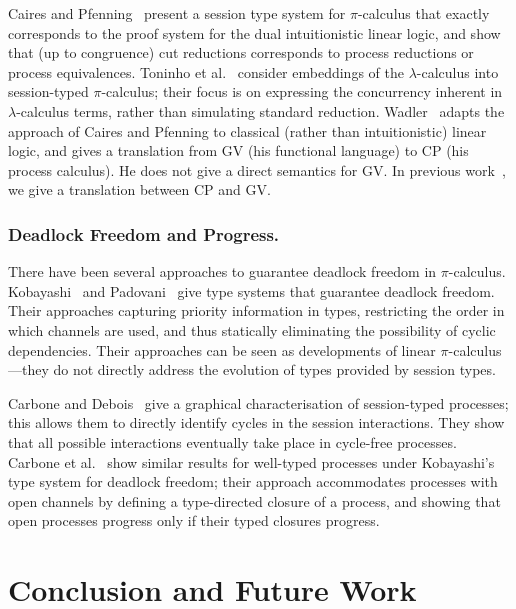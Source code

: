 \documentclass[oribibl,orivec,envcountsame]{llncs}
\begin{document}
Caires and Pfenning~\cite{CairesPfenning10} present a session type system for $\pi$-calculus that
exactly corresponds to the proof system for the dual intuitionistic linear logic, and show that (up
to congruence) cut reductions corresponds to process reductions or process equivalences.  Toninho et
al.~\cite{ToninhoCP12} consider embeddings of the $\lambda$-calculus into session-typed
$\pi$-calculus; their focus is on expressing the concurrency inherent in $\lambda$-calculus terms,
rather than simulating standard reduction. Wadler~\cite{Wadler14} adapts the approach of Caires and
Pfenning to classical (rather than intuitionistic) linear logic, and gives a translation from GV
(his functional language) to CP (his process calculus). He does not give a direct semantics for
GV. In previous work~\cite{LindleyM14}, we give a translation between CP and GV.

\subsubsection{Deadlock Freedom and Progress.}

There have been several approaches to guarantee deadlock freedom in $\pi$-calculus.
Kobayashi~\cite{Kobayashi06} and Padovani~\cite{Padovani14} give type systems that guarantee
deadlock freedom.  Their approaches capturing priority information in types, restricting the order
in which channels are used, and thus statically eliminating the possibility of cyclic dependencies.
Their approaches can be seen as developments of linear $\pi$-calculus---they do not directly address
the evolution of types provided by session types.

Carbone and Debois~\cite{Carbone10} give a graphical characterisation of session-typed processes;
this allows them to directly identify cycles in the session interactions.  They show that all
possible interactions eventually take place in cycle-free processes.  Carbone et
al.~\cite{CarboneDM14} show similar results for well-typed processes under Kobayashi's type system
for deadlock freedom; their approach accommodates processes with open channels by defining a
type-directed closure of a process, and showing that open processes progress only if their typed
closures progress.

\section{Conclusion and Future Work}\label{sec:conclusion}
\end{document}
